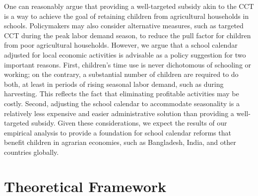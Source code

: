 \documentclass[12pt,letterpaper]{article}
\newcommand{\bfbeta}{\ensuremath{\mbox{\boldmath $\beta$}}}
\newcommand{\bfgamma}{\ensuremath{\mbox{\boldmath $\gamma$}}}
\newcommand{\bfomega}{\ensuremath{\mbox{\boldmath $\omega$}}}
\newcommand{\bfm}{\ensuremath{\mbox{\bf m}}}
\newcommand{\0}{\ensuremath{\mbox{\boldmath $0$}}}
\begin{document}
One can reasonably argue that providing a well-targeted subsidy akin to the CCT is a way to achieve the goal of retaining children from agricultural households in schools. Policymakers may also consider alternative measures, such as targeted CCT during the peak labor demand season, to reduce the pull factor for children from poor agricultural households. However, we argue that a school calendar adjusted for local economic activities is advisable as a policy suggestion for two important reasons. First, children's time use is never dichotomous of schooling or working; on the contrary, a substantial number of children are required to do both, at least in periods of rising seasonal labor demand, such as during harvesting. This reflects the fact that eliminating profitable activities may be costly. Second, adjusting the school calendar to accommodate seasonality is a relatively less expensive and easier administrative solution than providing a well-targeted subsidy. Given these considerations, we expect the results of our empirical analysis to provide a foundation for school calendar reforms that benefit children in agrarian economies, such as Bangladesh, India, and other countries globally.




\pagebreak

\doublespacing



\pagebreak
\renewcommand{\thefigure}{A\arabic{figure}}
\renewcommand{\theHfigure}{A\arabic{figure}}
\setcounter{figure}{0}

\renewcommand{\thetable}{A\arabic{table}}
\renewcommand{\theHtable}{A\arabic{table}}
\setcounter{table}{0}

\appendix
\setcounter{secnumdepth}{1}
\setcounter{section}{0}
\renewcommand{\thesection}{A\arabic{section}}


\section{Theoretical Framework}\label{app_a1}
\setcounter{equation}{0}
\renewcommand{\theequation}{A\arabic{equation}}
\newcommand{\defeq}{\mathrel{\mathop:}=}
\newcommand{\bfbeta}{\ensuremath{\mbox{\boldmath $\beta$}}}
\newcommand{\bfgamma}{\ensuremath{\mbox{\boldmath $\gamma$}}}
\newcommand{\bfomega}{\ensuremath{\mbox{\boldmath $\omega$}}}
\newcommand{\bfc}{\ensuremath{\mbox{\boldmath $c$}}}
\newcommand{\bfm}{\ensuremath{\mbox{\boldmath $m$}}}
\end{document}

